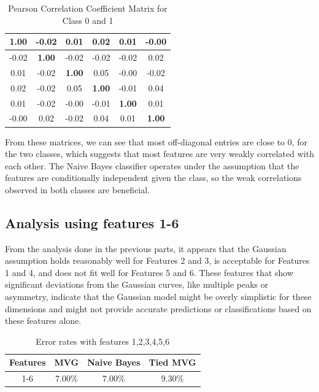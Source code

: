 \documentclass[12pt, a4paper]{article}
\begin{document}
\begin{table}[ht!]
	\centering
    \begin{tabular}{| | c c c c c c | |} 
 		\hline
 		\textbf{1.00} & -0.02 & 0.01 & 0.02 & 0.01 & -0.00 \\ 
 		\hline
 		-0.02 & \textbf{1.00} & -0.02 & -0.02 & -0.02 & 0.02 \\
 		\hline
 		0.01 & -0.02 & \textbf{1.00} & 0.05 & -0.00 & -0.02 \\
 		\hline
 		0.02 & -0.02 & 0.05 & \textbf{1.00} & -0.01 & 0.04 \\
 		\hline
 		0.01 & -0.02 & -0.00 & -0.01 & \textbf{1.00} & 0.01 \\
 		\hline
 		-0.00 & 0.02 & -0.02 & 0.04 & 0.01 & \textbf{1.00} \\
 		\hline
 	\end{tabular}
    \caption{Pearson Correlation Coefficient Matrix for Class 0 and 1}
\end{table}

From these matrices, we can see that most off-diagonal entries are close to 0, for the two classes, which suggests that most features are very weakly correlated with each other. The Naive Bayes classifier operates under the assumption that the features are conditionally independent given the class, so the weak correlations observed in both classes are beneficial.


\subsection{Analysis using features 1-6}

From the analysis done in the previous parts, it appears that the Gaussian assumption holds reasonably well for Features 2 and 3, is acceptable for Features 1 and 4, and does not fit well for Features 5 and 6. These features that show significant deviations from the Gaussian curves, like multiple peaks or asymmetry, indicate that the Gaussian model might be overly simplistic for these dimensions and might not provide accurate predictions or classifications based on these features alone.

\begin{table}[ht!]
	\centering
 	\begin{tabular}{| | c c c c | |} 
 		\hline
 		Features & MVG & Naive Bayes & Tied MVG\\
 		\hline\hline
 		1-6 & 7.00\% & 7.00\% & 9.30\%\\
 		\hline
 	\end{tabular}
	\caption{Error rates with features 1,2,3,4,5,6}
\end{table}
\end{document}
